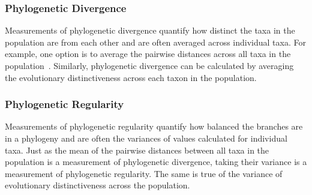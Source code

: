 \documentclass[letterpaper]{article}
\begin{document}
\subsubsection{Phylogenetic Divergence}

Measurements of phylogenetic divergence quantify how distinct the taxa in the population are from each other and are often %
averaged across
individual taxa. For example, one option is to 
average the pairwise distances across
all taxa in the population~\citep{webb_exploring_2000}. Similarly, phylogenetic divergence can be calculated by 
averaging the evolutionary distinctiveness across each taxon in the population.

\subsubsection{Phylogenetic Regularity}

Measurements of phylogenetic regularity quantify how balanced the branches are in a phylogeny and are often the variances of values calculated for individual taxa. Just as the mean of the pairwise distances between all taxa in the population is a measurement of phylogenetic divergence, taking their variance is a measurement of phylogenetic regularity. The same is true of the variance of evolutionary distinctiveness across the population.
\end{document}
